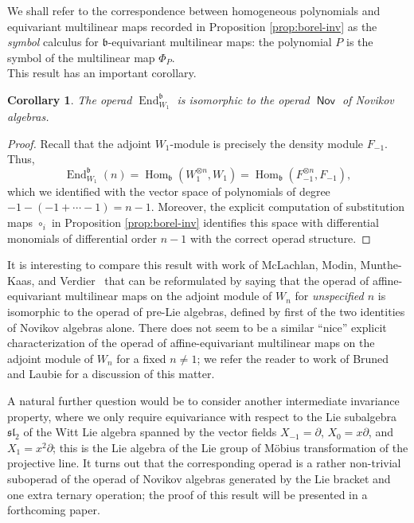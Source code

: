 \documentclass[11pt,reqno]{amsart}
\theoremstyle{plain}
\newtheorem{corollary}[theorem]{Corollary}
\theoremstyle{definition}
\theoremstyle{remark}
\DeclareMathOperator{\Nov}{\mathsf{Nov}}
\DeclareMathOperator{\Hom}{Hom}
\DeclareMathOperator{\End}{End}
\begin{document}
We shall refer to the correspondence between homogeneous polynomials and equivariant multilinear maps recorded in Proposition \ref{prop:borel-inv} as the \emph{symbol} calculus for $\mathfrak{b}$-equivariant multilinear maps: the polynomial $P$ is the symbol of the multilinear map $\Phi_P$.\\

This result has an important corollary. 
\begin{corollary}\label{cor:b-Nov}
The operad $\End^{\mathfrak{b}}_{W_1}$ is isomorphic to the operad $\Nov$ of Novikov algebras.
\end{corollary}

\begin{proof}
Recall that the adjoint $W_1$-module is precisely the density module $F_{-1}$. Thus, 
 \[
\End^{\mathfrak{b}}_{W_1}(n)=\Hom_{\mathfrak{b}}(W_1^{\otimes n},W_1)= \Hom_{\mathfrak{b}}(F_{-1}^{\otimes n},F_{-1}),   
 \]
which we identified with the vector space of polynomials of degree $-1-(-1+\cdots-1)=n-1$. Moreover, the explicit computation of substitution maps $\circ_i$ in Proposition \ref{prop:borel-inv} identifies this space with differential monomials of differential order $n-1$ with the correct operad structure.  
\end{proof}



It is interesting to compare this result with work of McLachlan, Modin, Munthe-Kaas, and Verdier~\cite{MR3510021} that can be reformulated by saying that the operad of affine-equivariant multilinear maps on the adjoint module of $W_n$ for \emph{unspecified $n$} is isomorphic to the operad of pre-Lie algebras, defined by first of the two identities of Novikov algebras alone. There does not seem to be a similar ``nice'' explicit characterization of the operad of affine-equivariant multilinear maps on the adjoint module of $W_n$ for a fixed $n\ne 1$; we refer the reader to work of Bruned and Laubie \cite{BL2025} for a discussion of this matter.

A natural further question would be to consider another intermediate invariance property, where we only require equivariance with respect to the Lie  subalgebra $\mathfrak{sl}_2$ of the Witt Lie algebra spanned by the vector fields $X_{-1}=\partial$, $X_0=x\partial$, and $X_1=x^2\partial$; this is the Lie algebra of the Lie group of Möbius transformation of the projective line. It turns out that the corresponding operad is a rather non-trivial suboperad of the operad of Novikov algebras generated by the Lie bracket and one extra ternary operation; the proof of this result will be presented in a forthcoming paper.
\end{document}
